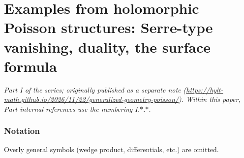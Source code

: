 \part{Examples from holomorphic Poisson structures: Serre-type vanishing, duality, the surface formula}
\setcounter{section}{0}
\noindent\textit{Part I of the series; originally published as a separate note (\url{https://hylt-math.github.io/2026/11/22/generalized-geometry-poisson/}). Within this paper, Part-internal references use the numbering I.$\ast$.$\ast$.}\par
\section{Notation}\label{p1:sec:notation}
Overly general symbols (wedge product, differentials, etc.) are omitted.


